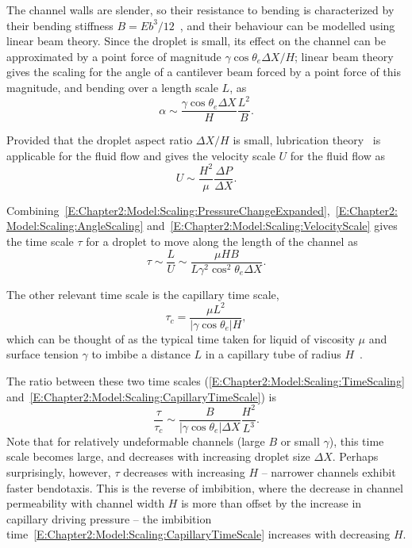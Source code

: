The channel walls are slender, so their resistance to bending is characterized by their bending stiffness $B = Eb^3/12$~\citep{Howell2009}, and their behaviour can be modelled using linear beam theory. Since the droplet is small, its effect on the channel can be approximated by a point force of magnitude $\gamma \cos \theta_e\Delta X /H$; linear beam theory~\citep{Howell2009} gives the scaling for the angle of a cantilever beam forced by a point force of this magnitude, and bending over a length scale $L$, as
\begin{equation}\label{E:Chapter2:Model:Scaling:AngleScaling}
\alpha \sim\frac{\gamma \cos \theta_e \Delta X}{H} \frac{L^2}{B}.
\end{equation}

Provided that the droplet aspect ratio $\Delta X /H$ is small, lubrication theory~\citep{Leal2007} is applicable for the fluid flow and gives the velocity scale $U$ for the fluid flow as
\begin{equation}\label{E:Chapter2:Model:Scaling:VelocityScale}
U \sim \frac{H^2}{\mu}\frac{\Delta P}{\Delta X}.
\end{equation}

Combining~\eqref{E:Chapter2:Model:Scaling:PressureChangeExpanded},~\eqref{E:Chapter2:Model:Scaling:AngleScaling} and~\eqref{E:Chapter2:Model:Scaling:VelocityScale} gives the time scale $\tau$ for a droplet to move along the length of the channel as
\begin{equation}\label{E:Chapter2:Model:Scaling:TimeScaling}
\tau \sim \frac{L}{U} \sim   \frac{\mu H B}{L \gamma^2 \cos^2 \theta_e \Delta X}.
\end{equation}

The other relevant time scale is the capillary time scale,
\begin{equation}\label{E:Chapter2:Model:Scaling:CapillaryTimeScale}
\tau_c = \frac{\mu L^2}{|\gamma\cos \theta_e| H},
\end{equation}
which can be thought of as the typical time taken for liquid of viscosity $\mu$ and surface tension $\gamma$ to imbibe a distance $L$ in a capillary tube of radius $H$~\citep{Washburn1921PhysRev}.

The ratio between these two time scales (\eqref{E:Chapter2:Model:Scaling:TimeScaling} and~\eqref{E:Chapter2:Model:Scaling:CapillaryTimeScale}) is
\begin{equation}\label{E:Chapter2:Model:Scaling:ScalingResult}
\frac{\tau}{\tau_c}\sim \frac{B}{|\gamma \cos \theta_e|\Delta X}\frac{H^2}{L^3}.
\end{equation}
Note that for relatively undeformable channels (large $B$ or small $\gamma$), this time scale becomes large, and decreases with increasing droplet size $\Delta X$. Perhaps surprisingly, however, $\tau$ decreases with increasing $H$ -- narrower channels exhibit faster bendotaxis. This is the reverse of imbibition, where the decrease in channel permeability with channel width $H$ is more than offset by the increase in capillary driving pressure -- the imbibition time~\eqref{E:Chapter2:Model:Scaling:CapillaryTimeScale} increases with decreasing $H$.


